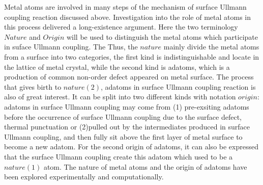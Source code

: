 \documentclass[%
 reprint,
 amsmath,amssymb,
 aps,
prb,
]{revtex4-2}
\begin{document}
Metal atoms are involved in many steps of the mechanism of surface Ullmann coupling reaction discussed above. Investigation into the role of metal atoms in this process delivered a long-existence argument.
Here the two terminology $Nature$ and $Origin$ will be used to distinguish the metal atoms which participate in suface Ullmann coupling.
The %
Thus, the $nature$ mainly divide the metal atoms from a surface into two categories, the first kind is indistinguishable and locate in the lattice of metal crystal, while the second kind is adatoms, which is a production of common non-order defect appeared on metal surface. 
The process that gives birth to $nature(2)$, adatoms in surface Ullmann coupling reaction is also of great interest. It can be split into two different kinds with notation $origin$: adatoms in surface Ullmann coupling may come from (1) pre-exsiting adatoms before the occurrence of surface Ullmann coupling due to the surface defect, thermal punctuation or (2)pulled out by the intermediates produced in surface Ullmann coupling, and then fully sit above the first layer of metal surface to become a new adatom. For the second origin of adatoms, it can also be expressed that the surface Ullmann coupling create this adatom which used to be a $nature(1)$ atom. The nature of metal atoms and the origin of adatoms have been explored experimentally and computationally.
\end{document}
